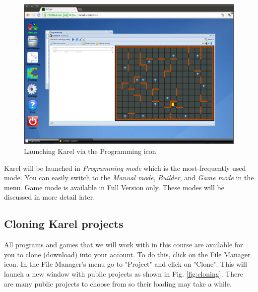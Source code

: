 \documentclass[article,A4,12pt]{llncs}
\begin{document}
\begin{figure}[!ht]
\begin{center}
\includegraphics[width=\textwidth]{img/init.png}
\end{center}
\caption{Launching Karel via the Programming icon}
\label{fig:init}
\end{figure}
\noindent
Karel will be launched in {\em Programming mode} which is the most-frequently 
used mode. You can easily switch to the {\em Manual mode}, {\em Builder},
and {\em Game mode} in the menu. Game mode is available in Full Version only. 
These modes will be discussed in more detail later.

\subsection{Cloning Karel projects} \label{cloning}

All programs and games that we will work with in this course are
available for you to clone (download) into your account. To do this, 
click on the File Manager icon. In the File Manager's menu go to 
"Project" and click on "Clone". This will launch a new window with public
projects as shown in Fig. \ref{fig:cloning}. There are many public
projects to choose from so their loading may take a while. 

\newpage
\end{document}
